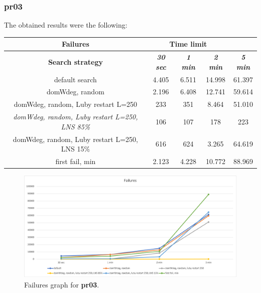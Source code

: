 \subsubsection{pr03}
The obtained results were the following:
{
\renewcommand{\arraystretch}{2}
\begin{longtable}[h]{| c | c | c | c | c |}
    \hline
    \textbf{Failures} & \multicolumn{3}{c}{Time limit} & \\
    \hline
    \textbf{Search strategy} & \textbf{\textit{30 sec}} & \textbf{\textit{1 min}} & \textbf{\textit{2 min}} & \textbf{\textit{5 min}} \\
    \hline
    \endhead
    default search                                         &  4.405 &  6.511 & 14.998 &  61.397 \\
    \hline
    domWdeg, random                                        &  2.196 &  6.408 & 12.741 &  59.614 \\
    \hline
    domWdeg, random, Luby restart L=250                    &   233 &   351 &  8.464 &  51.010 \\
    \hline
    \textit{domWdeg, random, Luby restart L=250, LNS 85\%} &   106 &   107 &   178 &    223 \\
    \hline
    domWdeg, random, Luby restart L=250, LNS 15\%          &   616 &   624 &  3.265 &  64.619 \\
    \hline
    first fail, min                                        &  2.123 &  4.228 & 10.772 &  88.969 \\
    \hline
\end{longtable}
}
\begin{figure}[H]
    \centering
    \includegraphics[width=0.8\columnwidth]{../graphs/pr03-failures.png}
    \caption{Failures graph for \textbf{pr03}.}
\end{figure}

